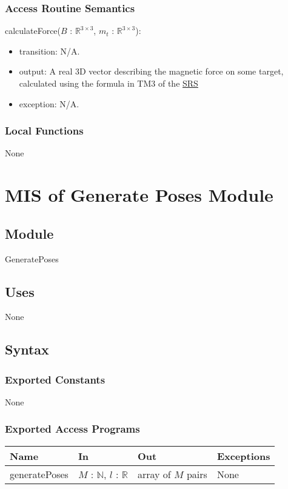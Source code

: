 \documentclass[12pt, titlepage]{article}
\begin{document}
\subsubsection{Access Routine Semantics}
\noindent calculateForce($B$ : $\mathbb{R}^{3 \times 3}$, $m_t$ : $\mathbb{R}^{3 \times 3}$):
\begin{itemize}
\item transition: N/A.
\item output: A real 3D vector describing the magnetic force on some target, calculated using the formula in TM3 of the \href{https://github.com/husseinsd1/optimal-em-arrangement/blob/main/docs/SRS/SRS.pdf}{SRS}
\item exception: N/A.
\end{itemize}

\subsubsection{Local Functions}
None
\newpage

\section{MIS of Generate Poses Module} \label{MISGenPoses}
\subsection{Module}
GeneratePoses

\subsection{Uses}
None

\subsection{Syntax}

\subsubsection{Exported Constants}
None

\subsubsection{Exported Access Programs}
\begin{center}
\begin{tabular}{p{3cm} p{4cm} p{4cm} p{3cm}}
\hline
\textbf{Name} & \textbf{In} & \textbf{Out} & \textbf{Exceptions} \\
\hline
generatePoses & $M$ : $\mathbb{N}$, $l$ : $\mathbb{R}$ & array of $M$ pairs & None \\
\hline
\end{tabular}
\end{center}
\end{document}
